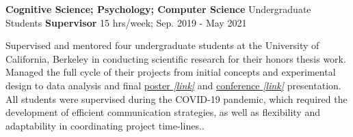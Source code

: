 
\begin{cventries}
 

  \cventry
    {\textbf{Cognitive Science; Psychology; Computer Science}} %
    {Undergraduate Students} %
    {\textbf{Supervisor}} %
    {15 hrs/week; Sep. 2019 - May 2021} %
    {
      \begin{cvitems} %
      	\item{Supervised and mentored four undergraduate students at the University of California, Berkeley in conducting scientific research for their honors thesis work. Managed the full cycle of their projects from initial concepts and experimental design to data analysis and final {\href{https://drive.google.com/file/d/1uhIOkii0y0wMr63KSzlhi7k7NqLEuFlU/view?usp=sharing}{poster \textit{[link]}}} and {\href{https://docs.google.com/presentation/d/1GmuGhTJFQFXBuVG_8zfoTIu2ForG47HIdeSV-09GFe8/edit?usp=sharing}{conference \textit{[link]}}} presentation. All students were supervised during the COVID-19 pandemic, which required the development of efficient communication strategies, as well as flexibility and adaptability in coordinating project time-lines.}.
      \end{cvitems}
    }
    
    
    

\end{cventries}

